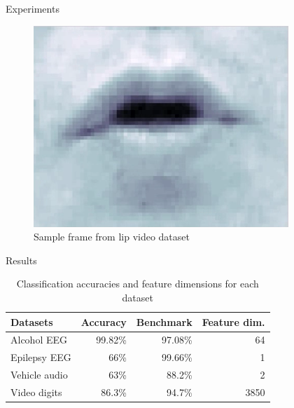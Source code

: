 \documentclass[final]{beamer}
\newlength{\onecolwid}
\begin{document}
\begin{frame}[t]
\begin{columns}[t]
\begin{column}{\onecolwid}
\begin{block}{Experiments}
    \begin{figure}
        \includegraphics[width=0.6\linewidth]{images/lip.png}
        \caption{Sample frame from lip video dataset}
    \end{figure}
\end{block}


\begin{block}{Results}
    \begin{table}
        \begin{tabular}{l r r r}
            \toprule
            \textbf{Datasets} & Accuracy & Benchmark & Feature dim. \\
            \midrule
            Alcohol EEG       & 99.82\%  & 97.08\% \cite{sharma_novel_2017}       & 64 \\
            Epilepsy EEG      & 66\%     & 99.66\% \cite{hutchison_eeg_2012}      & 1 \\
            Vehicle audio     & 63\%     & 88.2\% \cite{sunu_dimensionality_2018} & 2 \\
            Video digits      & 86.3\%   & 94.7\% \cite{lieu_signal_2011}         & 3850 \\
            \bottomrule
        \end{tabular}
        \caption{Classification accuracies and feature dimensions for each dataset}
        \label{results}
    \end{table}
\end{block}


\end{column} %


\end{columns}
\end{frame}
\end{document}
